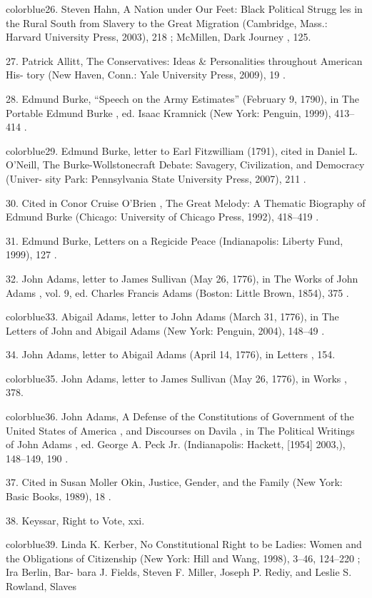 	{color{blue}26}. Steven Hahn, A Nation under Our Feet: Black Political Strugg les in the Rural South from Slavery to the Great Migration (Cambridge, Mass.: Harvard University Press, 2003), 218 ; McMillen, Dark Journey , 125.


	{\color{blue}27}. Patrick Allitt, The Conservatives: Ideas & Personalities throughout American His- tory (New Haven, Conn.: Yale University Press, 2009), 19 .


	{\color{blue}28}. Edmund Burke, “Speech on the Army Estimates” (February 9, 1790), in The Portable Edmund Burke , ed. Isaac Kramnick (New York: Penguin, 1999), 413–414 .


	{color{blue}29}. Edmund Burke, letter to Earl Fitzwilliam (1791), cited in Daniel L. O’Neill, The Burke-Wollstonecraft Debate: Savagery, Civilization, and Democracy (Univer- sity Park: Pennsylvania State University Press, 2007), 211 .


	{\color{blue}30}. Cited in Conor Cruise O’Brien , The Great Melody: A Thematic Biography of Edmund Burke (Chicago: University of Chicago Press, 1992), 418–419 .


	{\color{blue}31}. Edmund Burke, Letters on a Regicide Peace (Indianapolis: Liberty Fund, 1999), 127 .


	{\color{blue}32}. John Adams, letter to James Sullivan (May 26, 1776), in The Works of John Adams , vol. 9, ed. Charles Francis Adams (Boston: Little Brown, 1854), 375 .


	{color{blue}33}. Abigail Adams, letter to John Adams (March 31, 1776), in The Letters of John and Abigail Adams (New York: Penguin, 2004), 148–49 .


	{\color{blue}34}. John Adams, letter to Abigail Adams (April 14, 1776), in Letters , 154.


	{color{blue}35}. John Adams, letter to James Sullivan (May 26, 1776), in Works , 378.


	{color{blue}36}. John Adams, A Defense of the Constitutions of Government of the United States of America , and Discourses on Davila , in The Political Writings of John Adams , ed. George A. Peck Jr. (Indianapolis: Hackett, [1954] 2003,), 148–149, 190 .


	{\color{blue}37}. Cited in Susan Moller Okin, Justice, Gender, and the Family (New York: Basic Books, 1989), 18 .


	{\color{blue}38}. Keyssar, Right to Vote, xxi.


	{color{blue}39}. Linda K. Kerber, No Constitutional Right to be Ladies: Women and the Obligations of Citizenship (New York: Hill and Wang, 1998), 3–46, 124–220 ; Ira Berlin, Bar- bara J. Fields, Steven F. Miller, Joseph P. Rediy, and Leslie S. Rowland, Slaves


